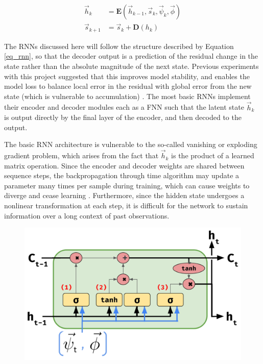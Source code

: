 \documentclass[11pt]{article}
\begin{document}
\begin{multicols}{2}
    \begin{equation}\label{eq_rnn}
        \begin{split}
            \vec{h}_k &= \mathbf{E}(\vec{h}_{k-1}, \vec{s}_k, \vec{\psi}_k, \vec{\phi}) \\
            \vec{s}_{k+1} &= \vec{s}_{k} + \mathbf{D}(h_k)
        \end{split}
    \end{equation}

    The RNNs discussed here will follow the structure described by Equation \ref{eq_rnn}, so that the decoder output is a prediction of the residual change in the state rather than the absolute magnitude of the next state. Previous experiments with this project suggested that this improves model stability, and enables the model loss to balance local error in the residual with global error from the new state (which is vulnerable to accumulation) \cite{he_deep_2015}. The most basic RNNs implement their encoder and decoder modules each as a FNN such that the latent state $\vec{h}_k$ is output directly by the final layer of the encoder, and then decoded to the output.

    The basic RNN architecture is vulnerable to the so-called vanishing or exploding gradient problem, which arises from the fact that $\vec{h}_k$ is the product of a learned matrix operation. Since the encoder and decoder weights are shared between sequence steps, the backpropagation through time algorithm may update a parameter many times per sample during training, which can cause weights to diverge and cease learning \cite{mozer_focused_1995}. Furthermore, since the hidden state undergoes a nonlinear transformation at each step, it is difficult for the network to sustain information over a long context of past observations.

    \begin{figure}[H]
        \centering

        \includegraphics[width=.8\linewidth]{figs/lstm.png}


\end{figure}
\end{multicols}
\end{document}
